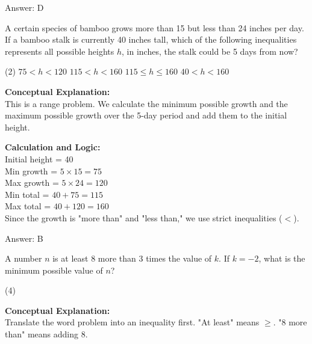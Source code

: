 \documentclass[11pt,paper=a4,answers]{exam}
\begin{document}
\begin{questions}
\begin{solution}
\vspace{15pt}
Answer: \colorbox{yellow!100}{D}
\end{solution}

\vspace{20pt}

\question
A certain species of bamboo grows more than 15 but less than 24 inches per day. If a bamboo stalk is currently 40 inches tall, which of the following inequalities represents all possible heights $h$, in inches, the stalk could be 5 days from now?
\begin{tasks}(2)
    \task $75 < h < 120$
    \task $115 < h < 160$
    \task $115 \le h \le 160$
    \task $40 < h < 160$
\end{tasks}

\begin{solution}
\textbf{Conceptual Explanation:} \\
This is a range problem. We calculate the minimum possible growth and the maximum possible growth over the 5-day period and add them to the initial height.

\vspace{10pt}
\textbf{Calculation and Logic:} \\
Initial height = 40 \\
Min growth = $5 \times 15 = 75$ \\
Max growth = $5 \times 24 = 120$ \\
Min total = $40 + 75 = 115$ \\
Max total = $40 + 120 = 160$ \\
Since the growth is "more than" and "less than," we use strict inequalities ($<$).

\vspace{15pt}
Answer: \colorbox{yellow!100}{B}
\end{solution}

\vspace{20pt}

\question
A number $n$ is at least 8 more than 3 times the value of $k$. If $k = -2$, what is the minimum possible value of $n$?
\begin{tasks}(4)
\end{tasks}

\begin{solution}
\textbf{Conceptual Explanation:} \\
Translate the word problem into an inequality first. "At least" means $\ge$. "8 more than" means adding 8.


\end{solution}
\end{questions}
\end{document}
